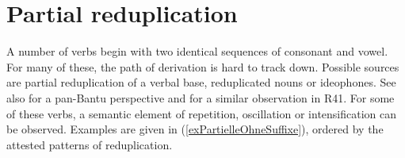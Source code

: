 \section{Partial reduplication}\label{PartialReduplication}
A number of verbs begin with two identical sequences of consonant and vowel. For many of these, the path of derivation is hard to track down. Possible sources are partial reduplication of a verbal base, reduplicated nouns or ideophones. See also \citet[79]{SchadebergT2003a} for a pan-Bantu perspective and \citet[262]{SeidelF2008} for a similar observation in  R41. For some of these verbs, a semantic element of repetition, oscillation or intensification can be observed. Examples are given in (\ref{exPartielleOhneSuffixe}), ordered by the attested patterns of reduplication.



